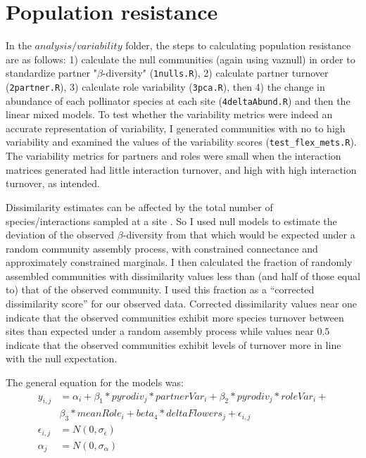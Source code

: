 \documentclass{article}\usepackage[]{graphicx}\usepackage[]{color}
\begin{document}
\section{Population resistance}
  \label{sec:pop_resist}

  In the $analysis/variability$ folder, the steps to calculating
  population resistance are as follows: 1) calculate the null
  communities (again using vaznull) in order to standardize partner
  "$\beta$-diversity" (\texttt{1nulls.R}), 2) calculate partner
  turnover (\texttt{2partner.R}), 3) calculate role variability
  (\texttt{3pca.R}), then 4) the change in abundance of each
  pollinator species at each site (\texttt{4deltaAbund.R}) and then
  the linear mixed models. To test whether the variability metrics
  were indeed an accurate representation of variability, I generated
  communities with no to high variability and examined the values of
  the variability scores (\texttt{test\_flex\_mets.R}). The
  variability metrics for partners and roles were small when the
  interaction matrices generated had little interaction turnover, and
  high with high interaction turnover, as intended.

  Dissimilarity estimates can be affected by the total number of
  species/interactions sampled at a site
  \citep[e.g.,][]{Chase2011}. So I used null models to estimate the
  deviation of the observed $\beta$-diversity from that which would be
  expected under a random community assembly process, with constrained
  connectance and approximately constrained marginals.  I then
  calculated the fraction of randomly assembled communities with
  dissimilarity values less than (and half of those equal to) that of
  the observed community. I used this fraction as a ``corrected
  dissimilarity score'' for our observed data.  Corrected
  dissimilarity values near one indicate that the observed communities
  exhibit more species turnover between sites than expected under a
  random assembly process while values near $0.5$ indicate that the
  observed communities exhibit levels of turnover more in line with
  the null expectation.

The general equation for the models was: 
\begin{equation}
  \label{equ:pop_resist}
\begin{aligned}
y_{i,j} & = \alpha_i + \beta_1*pyrodiv_j*partnerVar_i +
\beta_2*pyrodiv_j*roleVar_i + \\
& \beta_3*meanRole_i + 
beta_4*deltaFlowers_j + \epsilon_{i,j} \\
\epsilon_{i,j} & = N(0, \sigma_{\epsilon}) \\
\alpha_j & = N(0, \sigma_{\alpha})
\end{aligned}
\end{equation}
\end{document}
